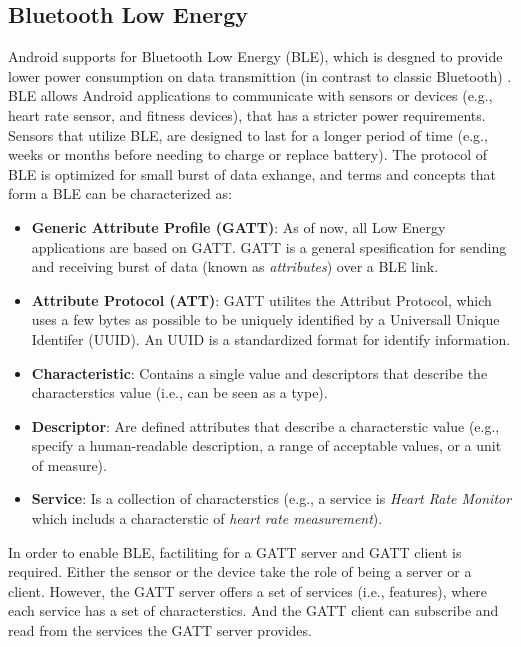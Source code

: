 \subsection{Bluetooth Low Energy}
Android supports for Bluetooth Low Energy (BLE), which is desgned to provide lower power consumption on data transmittion (in contrast to classic Bluetooth) \cite{bluetoothle}. BLE allows Android applications to communicate with sensors or devices (e.g., heart rate sensor, and fitness devices), that has a stricter power requirements. Sensors that utilize BLE, are designed to last for a longer period of time (e.g., weeks or months before needing to charge or replace battery). The protocol of BLE is optimized for small burst of data exhange, and terms and concepts that form a BLE can be characterized as:
\begin{itemize}
    \item \textbf{Generic Attribute Profile (GATT)}: As of now, all Low Energy applications are based on GATT. GATT is a general spesification for sending and receiving burst of data (known as \textit{attributes}) over a BLE link. 
    \item \textbf{Attribute Protocol (ATT)}: GATT utilites the Attribut Protocol, which uses a few bytes as possible to be uniquely identified by a Universall Unique Identifer (UUID). An UUID is a standardized format for identify information.
    \item \textbf{Characteristic}: Contains a single value and descriptors that describe the characterstics value (i.e., can be seen as a type). 
    \item \textbf{Descriptor}: Are defined attributes that describe a characterstic value (e.g., specify a human-readable description, a range of acceptable values, or a unit of measure).
    \item \textbf{Service}: Is a collection of characterstics (e.g., a service is \textit{Heart Rate Monitor} which includs a characterstic of \textit{heart rate measurement}).
\end{itemize}
In order to enable BLE, factiliting for a GATT server and GATT client is required. Either the sensor or the device take the role of being a server or a client. However, the GATT server offers a set of services (i.e., features), where each service has a set of characterstics. And the GATT client can subscribe and read from the services the GATT server provides. 